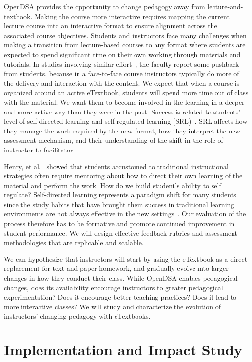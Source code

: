 \documentclass[11pt]{article}
\begin{document}
OpenDSA provides the opportunity to change pedagogy away from
lecture-and-textbook.
Making the course more interactive requires
mapping the current lecture course into an interactive
format to ensure alignment across the associated course objectives.
Students and instructors face many challenges when making a
transition from lecture-based courses to any format where students are
expected to spend significant time on their own working through
materials and tutorials.
In studies involving similar effort~\cite{Henry2010},
the faculty report some pushback from students,
because in a face-to-face course instructors typically do more of
the delivery and interaction with the content.
We expect that when a course is organized around an active eTextbook,
students will spend more time out of class with the material.
We want them to become involved in the learning in a
deeper and more active way than they were in the past.
Success is related to students' level of self-directed learning and
self-regulated learning (SRL)~\cite{Muis2007,Hofer1997}.
SRL affects how they manage the work required by the new format, how
they interpret the new assessment mechanism,
and their understanding of the shift in the role of instructor to
facilitator.

Henry, et al.~\cite{Henry2010} showed that students accustomed to
traditional instructional strategies often require mentoring about how
to direct their own learning of the material and perform the work.
How do we build student's ability to self regulate? 
Self-directed learning represents a paradigm shift for
many students since the study habits that have brought them success in
traditional learning environments are not always effective in the new
settings~\cite{Hmelo-Silver2004}.
Our evaluation of the process therefore has to be formative and
promote continued improvement in student performance.
We will design effective feedback rubrics and assessment methodologies
that are replicable and scalable.

We can hypothesize that instructors will start by using the eTextbook
as a direct replacement for text and paper homework, and gradually
evolve into larger changes in how they conduct their class.
While OpenDSA enables pedagogical changes, does its availability
encourage instructors to greater pedagogical experimentation?
Does it encourage better teaching practices?
Does it lead to more interactive classes?
We will study and characterize the evolution of instructors' changing
pedagogy with eTextbooks.

\section{Implementation and Impact Study}
\label{EvalSec}
\end{document}
